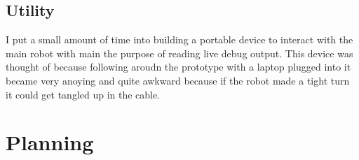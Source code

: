 \documentclass[11pt,fleqn,twoside]{article}
\begin{document}
\subsection{Utility}
I put a small amount of time into building a portable device to interact with the main robot with main the purpose of reading live debug output.  This device was thought of because following aroudn the prototype with a laptop plugged into it became very anoying and quite awkward because if the robot made a tight turn it could get tangled up in the cable.

\section{Planning}


\nocite{*} %

\newpage
{}

%
%

\renewcommand{\refname}{Annotated Bibliography}  %
\end{document}
